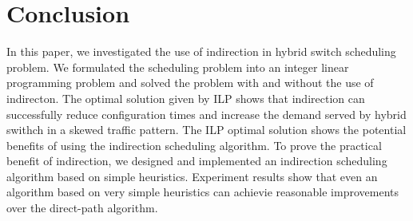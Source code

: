 \section{Conclusion}
\label{sec:conclusion}
In this paper, we investigated the use of indirection in hybrid switch scheduling problem. We formulated the scheduling problem into an integer linear programming problem and solved the problem with and without the use of indirecton. The optimal solution given by ILP shows that indirection can successfully reduce configuration times and increase the demand served by hybrid swithch in a skewed traffic pattern. The ILP optimal solution shows the potential benefits of using the indirection scheduling algorithm. To prove the practical benefit of indirection, we designed and implemented an indirection scheduling algorithm based on simple heuristics. Experiment results show that even an algorithm based on very simple heuristics can achievie reasonable improvements over the direct-path algorithm. 
